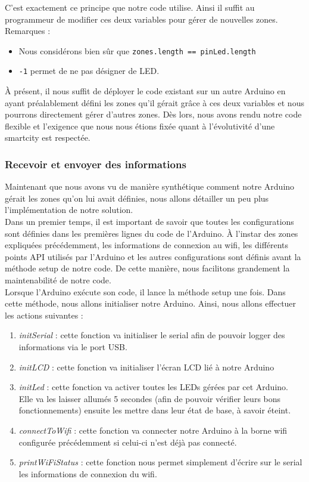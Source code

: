C’est exactement ce principe que notre code utilise. Ainsi il suffit au programmeur de modifier ces deux variables pour gérer de nouvelles zones.\\

Remarques :
\begin{itemize}
\item Nous considérons bien sûr que \texttt{zones.length == pinLed.length}
\item \texttt{-1} permet de ne pas désigner de LED.\\
\end{itemize}

À présent, il nous suffit de déployer le code existant sur un autre Arduino en ayant préalablement défini les zones qu’il gérait grâce à ces deux variables et nous pourrons directement gérer d’autres zones. Dès lors, nous avons rendu notre code flexible et l’exigence que nous nous étions fixée quant à l’évolutivité d’une smartcity est respectée.

\subsubsection{Recevoir et envoyer des informations}
Maintenant que nous avons vu de manière synthétique comment notre Arduino gérait les zones qu’on lui avait définies, nous allons détailler un peu plus l’implémentation de notre solution. \\

Dans un premier temps, il est important de savoir que toutes les configurations sont définies dans les premières lignes du code de l’Arduino. À l’instar des zones expliquées précédemment, les informations de connexion au wifi, les différents points API utilisés par l’Arduino et les autres configurations sont définis avant la méthode setup de notre code. De cette manière, nous facilitons grandement la maintenabilité de notre code. \\

Lorsque l’Arduino exécute son code, il lance la méthode setup une fois. Dans cette méthode, nous allons initialiser notre Arduino. Ainsi, nous allons effectuer les actions suivantes :

\begin{enumerate}
\item \emph{initSerial} : cette fonction va initialiser le serial afin de pouvoir logger des informations via le port USB.
\item \emph{initLCD} : cette fonction va initialiser l’écran LCD lié à notre Arduino
\item \emph{initLed} : cette fonction va activer toutes les LEDs gérées par cet Arduino. Elle va les laisser allumés 5 secondes (afin de pouvoir vérifier leurs bons fonctionnements) ensuite les mettre dans leur état de base, à savoir éteint.
\item \emph{connectToWifi} : cette fonction va connecter notre Arduino à la borne wifi configurée précédemment si celui-ci n’est déjà pas connecté.
\item \emph{printWiFiStatus} : cette fonction nous permet simplement d’écrire sur le serial les informations de connexion du wifi.\\
\end{enumerate}

